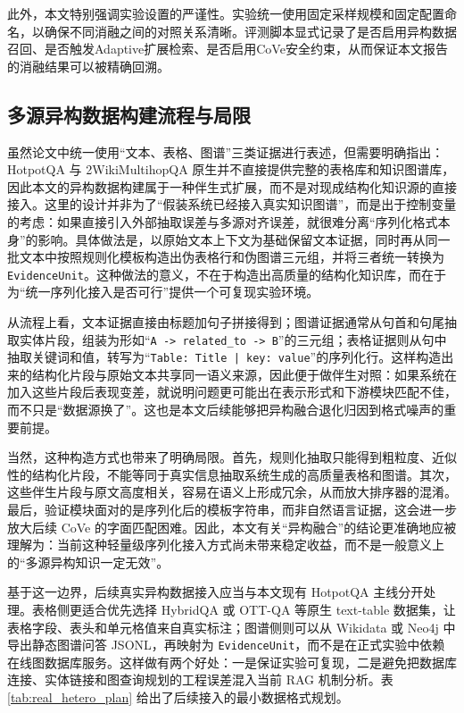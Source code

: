 此外，本文特别强调实验设置的严谨性。实验统一使用固定采样规模和固定配置命名，以确保不同消融之间的对照关系清晰。评测脚本显式记录了是否启用异构数据召回、是否触发Adaptive扩展检索、是否启用CoVe安全约束，从而保证本文报告的消融结果可以被精确回溯。

\subsection{多源异构数据构建流程与局限}

虽然论文中统一使用“文本、表格、图谱”三类证据进行表述，但需要明确指出：HotpotQA 与 2WikiMultihopQA 原生并不直接提供完整的表格库和知识图谱库，因此本文的异构数据构建属于一种伴生式扩展，而不是对现成结构化知识源的直接接入。这里的设计并非为了“假装系统已经接入真实知识图谱”，而是出于控制变量的考虑：如果直接引入外部抽取误差与多源对齐误差，就很难分离“序列化格式本身”的影响。具体做法是，以原始文本上下文为基础保留文本证据，同时再从同一批文本中按照规则化模板构造出伪表格行和伪图谱三元组，并将三者统一转换为 \texttt{EvidenceUnit}。这种做法的意义，不在于构造出高质量的结构化知识库，而在于为“统一序列化接入是否可行”提供一个可复现实验环境。

从流程上看，文本证据直接由标题加句子拼接得到；图谱证据通常从句首和句尾抽取实体片段，组装为形如“\texttt{A -> related\_to -> B}”的三元组；表格证据则从句中抽取关键词和值，转写为“\texttt{Table: Title | key: value}”的序列化行。这样构造出来的结构化片段与原始文本共享同一语义来源，因此便于做伴生对照：如果系统在加入这些片段后表现变差，就说明问题更可能出在表示形式和下游模块匹配不佳，而不只是“数据源换了”。这也是本文后续能够把异构融合退化归因到格式噪声的重要前提。

当然，这种构造方式也带来了明确局限。首先，规则化抽取只能得到粗粒度、近似性的结构化片段，不能等同于真实信息抽取系统生成的高质量表格和图谱。其次，这些伴生片段与原文高度相关，容易在语义上形成冗余，从而放大排序器的混淆。最后，验证模块面对的是序列化后的模板字符串，而非自然语言证据，这会进一步放大后续 CoVe 的字面匹配困难。因此，本文有关“异构融合”的结论更准确地应被理解为：当前这种轻量级序列化接入方式尚未带来稳定收益，而不是一般意义上的“多源异构知识一定无效”。

基于这一边界，后续真实异构数据接入应当与本文现有 HotpotQA 主线分开处理。表格侧更适合优先选择 HybridQA 或 OTT-QA 等原生 text-table 数据集，让表格字段、表头和单元格值来自真实标注；图谱侧则可以从 Wikidata 或 Neo4j 中导出静态图谱问答 JSONL，再映射为 \texttt{EvidenceUnit}，而不是在正式实验中依赖在线图数据库服务。这样做有两个好处：一是保证实验可复现，二是避免把数据库连接、实体链接和图查询规划的工程误差混入当前 RAG 机制分析。表\ref{tab:real_hetero_plan} 给出了后续接入的最小数据格式规划。


